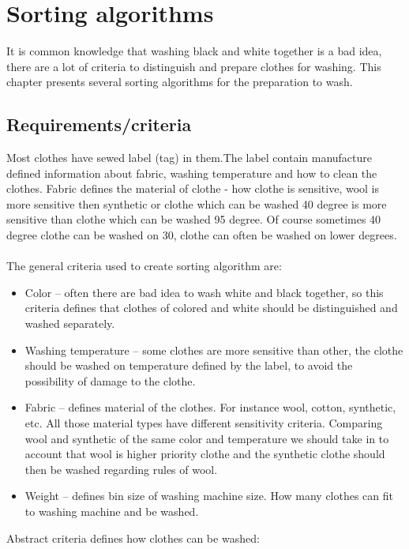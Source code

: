 %
\section{Sorting algorithms}

It is common knowledge that washing black and white together is a bad idea, there are a lot of criteria to distinguish and prepare clothes for washing. This chapter presents several sorting algorithms for the preparation to wash. 

\subsection{Requirements/criteria}

Most clothes have sewed label (tag) in them.The label contain manufacture defined information about fabric, washing temperature and how to clean the clothes. Fabric defines the material of clothe - how clothe is sensitive, wool is more sensitive then synthetic or clothe which can be washed 40 degree is more sensitive than clothe which can be washed 95 degree. Of course sometimes 40 degree clothe can be washed on 30, clothe can often be washed on lower degrees. \\ \\ The general criteria used to create sorting algorithm are:

\begin{itemize}
	\item Color – often there are bad idea to wash white and black together, so this criteria defines that clothes of colored and white should be distinguished and washed separately. 
	\item Washing temperature – some clothes are more sensitive than other, the clothe should be washed on temperature defined by the label, to avoid the possibility of damage to the clothe.
	\item Fabric – defines material of the clothes. For instance wool, cotton, synthetic, etc. All those material types have different sensitivity criteria. Comparing wool and synthetic of the same color and temperature we should take in to account that wool is higher priority clothe and the synthetic clothe should then be washed regarding rules of wool.
	\item Weight – defines bin size of washing machine size. How many clothes can fit to washing machine and be washed.
\end{itemize}

Abstract criteria defines how clothes can be washed:

